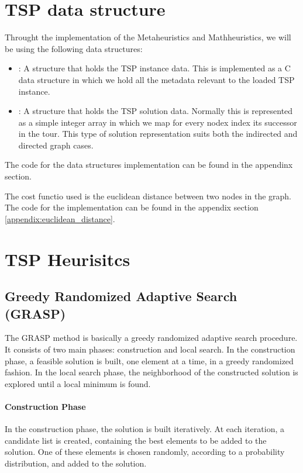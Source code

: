 \documentclass{article}
\begin{document}
\section{TSP data structure}
Throught the implementation of the Metaheuristics and Mathheuristics, we will be using the following data structures:
\begin{itemize}
	\item {} : A structure that holds the TSP instance data. This is implemented as a C data structure
	      in which we hold all the metadata relevant to the loaded TSP instance.
	\item {} : A structure that holds the TSP solution data. Normally this is represented as a simple integer array in which we map for every nodex
	      index its successor in the tour. This type of solution representation suits both the indirected and directed graph cases.
\end{itemize}
The code for the data structures implementation can be found in the appendinx section.

The cost functio used is the euclidean distance between two nodes in the graph.
The code for the implementation can be found in the appendix section \ref{appendix:euclidean_distance}.
\section{TSP Heurisitcs}
\subsection{Greedy Randomized Adaptive Search (GRASP)}
The GRASP method is basically a greedy randomized adaptive search procedure.
It consists of two main phases: construction and local search.
In the construction phase, a feasible solution is built, one element at a time, in a greedy randomized fashion.
In the local search phase, the neighborhood of the constructed solution is explored until a local minimum is found.

\paragraph{Construction Phase}
In the construction phase, the solution is built iteratively. At each iteration, a candidate list is created,
containing the best elements to be added to the solution. One of these elements is chosen randomly, according
to a probability distribution, and added to the solution.
\end{document}
